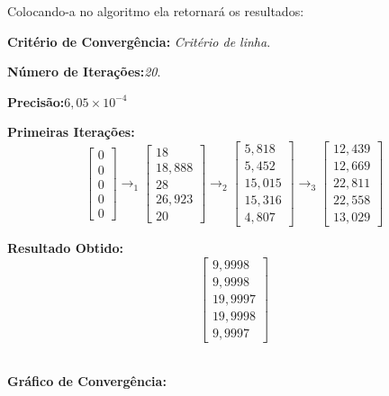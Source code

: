 \documentclass[
12pt,				%
openright,			%
twoside,			%
a4paper,			%
english,			%
french,				%
spanish,			%
brazil				%
]{abntex2_new}
\begin{document}
		Colocando-a no algoritmo ela retornará os resultados:
		
		\begin{alineas}
			\item{\textbf{Critério de Convergência:} \textit{Critério de linha}.}
			\item{\textbf{Número de Iterações:}\textit{20}.}
			\item{\textbf{Precisão:}\textit{$6,05 \times 10^{-4}$}}
			\item{\textbf{Primeiras Iterações:}\\
				$$	\begin{bmatrix}
				0\\
				0\\
				0\\
				0\\
				0
				\end{bmatrix} \rightarrow_1
				\begin{bmatrix}
				18\\
				18,888\\
				28\\
				26,923\\
				20
				\end{bmatrix} \rightarrow_2
				\begin{bmatrix}
				5,818\\
				5,452\\
				15,015\\
				15,316\\
				4,807
				\end{bmatrix} \rightarrow_3
				\begin{bmatrix}
				12,439\\
				12,669\\
				22,811\\
				22,558\\
				13,029
				\end{bmatrix}$$
			}
			\item{\textbf{Resultado Obtido:}}\\
			$$\begin{bmatrix}
			9,9998\\
			9,9998\\
			19,9997\\
			19,9998\\
			9,9997
			\end{bmatrix}$$\\
			
			\item{\textbf{Gráfico de Convergência:}}
			

\end{alineas}
\end{document}
